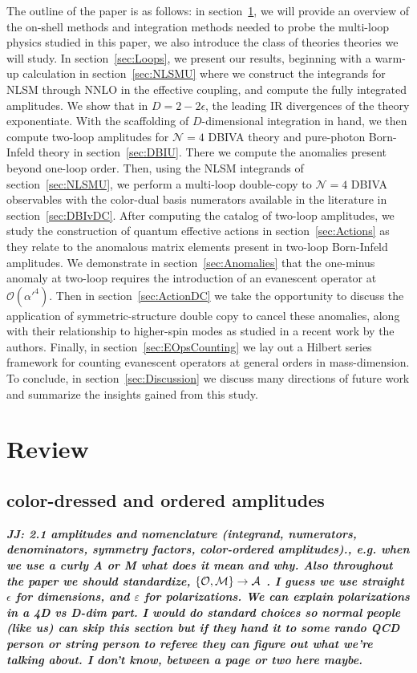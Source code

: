 \documentclass[12pt,letter]{article}
\def\sect#1{section~\ref{#1}}
\def\dj#1{{\color{NUpurple}\it \bf JJ: #1}}
\begin{document}
The outline of the paper is as follows: in \sect{sec:Review}, we will provide an overview of the on-shell methods and integration methods needed to probe the multi-loop physics studied in this paper, we also introduce the class of theories theories we will study. In \sect{sec:Loops}, we present our results, beginning with a warm-up calculation in \sect{sec:NLSMU} where we construct the integrands for NLSM through NNLO in the effective coupling, and compute the fully integrated amplitudes. We show that in $D=2-2\epsilon$, the leading IR divergences of the theory exponentiate. With the scaffolding of $D$-dimensional integration in hand, we then compute two-loop amplitudes for $\mathcal{N}=4$ DBIVA theory and pure-photon Born-Infeld theory in \sect{sec:DBIU}. There we compute the anomalies present beyond one-loop order.  Then, using the NLSM integrands of \sect{sec:NLSMU}, we perform a multi-loop double-copy to $\mathcal{N}=4$ DBIVA observables with the color-dual basis numerators available in the literature in \sect{sec:DBIvDC}. After computing the catalog of two-loop amplitudes, we study the construction of quantum effective actions in \sect{sec:Actions} as they relate to the anomalous matrix elements present in two-loop Born-Infeld amplitudes. We demonstrate in \sect{sec:Anomalies} that the one-minus anomaly at two-loop requires the introduction of an evanescent operator at $\mathcal{O}(\alpha'^4)$. Then in \sect{sec:ActionDC} we take the opportunity to discuss the application of symmetric-structure double copy to cancel these anomalies, along with their relationship to higher-spin modes as studied in a recent work by the authors. Finally, in \sect{sec:EOpsCounting} we lay out a Hilbert series framework for counting evanescent operators at general orders in mass-dimension. To conclude, in \sect{sec:Discussion} we discuss many directions of future work and summarize the insights gained from this study. 


\section{Review} 
\label{sec:Review}
\subsection{color-dressed and ordered amplitudes}
\label{subsec:AmpReview}
\dj{2.1 amplitudes and nomenclature (integrand, numerators, denominators, symmetry factors, color-ordered amplitudes)., e.g. when we use a curly A or M what does it mean and why. Also throughout the paper we should standardize, $\{\cal{O},{\cal{M}}\}\to\cal{A}$ .  I guess we use straight $\epsilon$ for dimensions, and $\varepsilon$ for polarizations.  We can explain polarizations in a 4D vs D-dim part. I would do standard choices so normal people (like us) can skip this section but if they hand it to some rando QCD person or string person to referee they can figure out what we're talking about. I don't know, between a page or two here maybe.}
\end{document}
